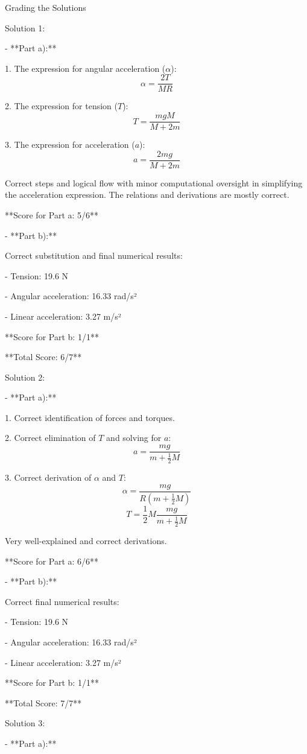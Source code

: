 \documentclass[a4paper,11pt]{article}
\begin{document}
Grading the Solutions

Solution 1:

- **Part a):**

  1. The expression for angular acceleration (\( \alpha \)): \[ \alpha = \frac{2T}{M R} \]
  
  2. The expression for tension (\( T \)): \[ T = \frac{mgM}{M + 2m} \]
  
  3. The expression for acceleration (\( a \)): \[ a = \frac{2mg}{M + 2m} \]

  Correct steps and logical flow with minor computational oversight in simplifying the acceleration expression. The relations and derivations are mostly correct.

  **Score for Part a: 5/6**

- **Part b):**

  Correct substitution and final numerical results:
  
  - Tension: 19.6 N
  
  - Angular acceleration: 16.33 rad/s²
  
  - Linear acceleration: 3.27 m/s²

  **Score for Part b: 1/1**

  **Total Score: 6/7**

Solution 2:

- **Part a):**

  1. Correct identification of forces and torques.
  
  2. Correct elimination of \( T \) and solving for \( a \):
     \[ a = \frac{mg}{m + \frac{1}{2} M} \]
  
  3. Correct derivation of \( \alpha \) and \( T \):
     \[ \alpha = \frac{mg}{R(m + \frac{1}{2} M)} \]
     \[ T = \frac{1}{2} M \frac{mg}{m + \frac{1}{2} M} \]

  Very well-explained and correct derivations.

  **Score for Part a: 6/6**

- **Part b):**

  Correct final numerical results:
  
  - Tension: 19.6 N
  
  - Angular acceleration: 16.33 rad/s²
  
  - Linear acceleration: 3.27 m/s²

  **Score for Part b: 1/1**

  **Total Score: 7/7**

Solution 3:

- **Part a):**
\end{document}
